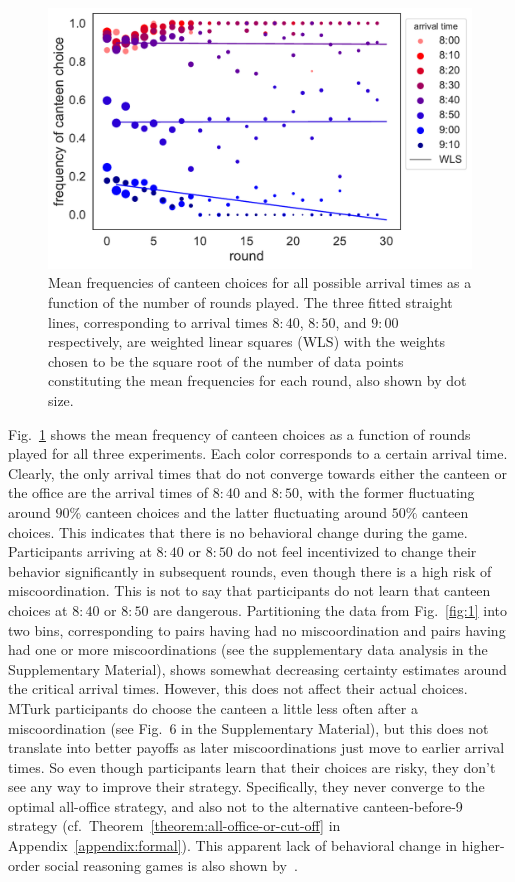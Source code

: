 \documentclass[twocolumn,a4paper,superscriptaddress,nofootinbib]{revtex4}
\begin{document}
\begin{figure} %
\centering\includegraphics[width=0.8\linewidth]{fig4_timeseries}
\caption{Mean frequencies of canteen choices for all possible arrival times as a function of the number of rounds played. The three fitted straight lines, corresponding to arrival times $8{:}40$, $8{:}50$, and $9{:}00$ respectively, are weighted linear squares (WLS) with the weights chosen to be the square root of the number of data points constituting the mean frequencies for each round, also shown by dot size.}
\label{timeseries}
\end{figure}
Fig.~\ref{timeseries} shows the mean frequency of canteen choices as a function of rounds played for all three experiments. Each color corresponds to a certain arrival time. Clearly, the only arrival times that do not converge towards either the canteen or the office are the arrival times of $8{:}40$ and $8{:}50$, with the former fluctuating around $90\%$ canteen choices and the latter fluctuating around $50\%$ canteen choices. This indicates that there is no behavioral change during the game. Participants arriving at $8{:}40$ or $8{:}50$ do not feel incentivized to change their behavior significantly in subsequent rounds, even though there is a high risk of miscoordination. This is not to say that participants do not learn that canteen choices at $8{:}40$ or $8{:}50$ are dangerous. Partitioning the data from Fig.~\ref{fig:1} into two bins, corresponding to pairs having had no miscoordination and pairs having had one or more miscoordinations (see the supplementary data analysis in the Supplementary Material), shows somewhat decreasing certainty estimates around the critical arrival times. However, this does not affect their actual choices. MTurk participants do choose the canteen a little less often after a miscoordination (see Fig.~6 in the Supplementary Material), but this does not translate into better payoffs as later miscoordinations just move to earlier arrival times. So even though participants learn that their choices are risky, they don't see any way to improve their strategy. Specifically, they never converge to the optimal all-office strategy, and also not to the alternative canteen-before-9 strategy (cf.\ Theorem~\ref{theorem:all-office-or-cut-off} in Appendix~\ref{appendix:formal}). This apparent lack of behavioral change in higher-order social reasoning games is also shown by~\citet{verbrugge2008learning}. 
\end{document}
